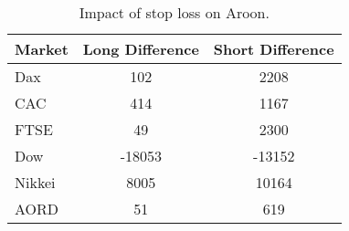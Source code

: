 \begin{table}[ht]
\centering
\caption[Impact of using stop loss with Aroon trend indicator.]{Impact of stop loss on Aroon.} 
\label{tab:aroon_results_sloss_diff}
\begin{tabular}{lcc}
  \toprule Market & Long Difference & Short Difference \\ 
  \midrule Dax & 102 & 2208 \\ 
  CAC & 414 & 1167 \\ 
  FTSE & 49 & 2300 \\ 
  Dow & -18053 & -13152 \\ 
  Nikkei & 8005 & 10164 \\ 
  AORD & 51 & 619 \\ 
   \bottomrule \end{tabular}
\end{table}
